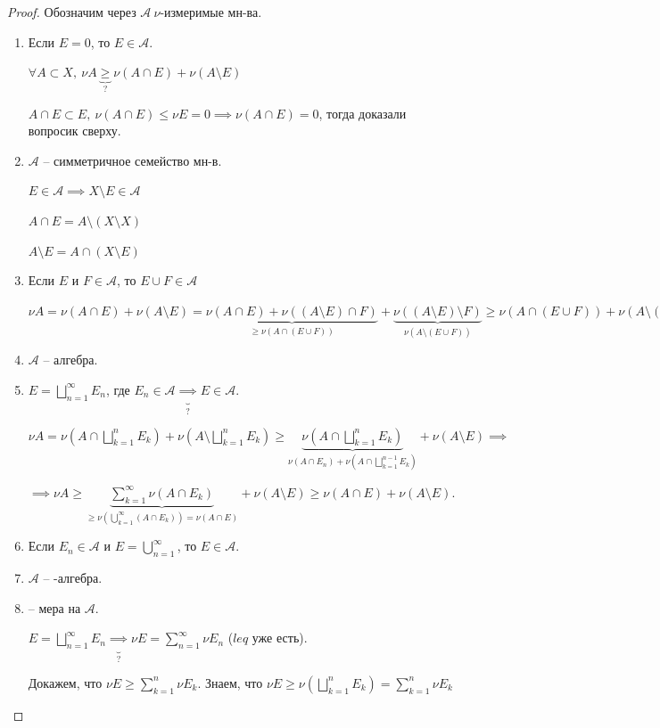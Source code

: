 \begin{proof}
    Обозначим через $\mathcal{A} \ \nu$-измеримые мн-ва. 

    \begin{enumerate}
        \item {
            Если $E = 0$, то $E \in \mathcal{A}$. 

            $\forall A \subset X, \ \nu A \underbrace{\geq}_{?} \nu (A \cap E) + \nu (A \setminus E)$

            $A \cap E \subset E, \ \nu (A \cap E) \leq \nu E = 0 \implies \nu (A \cap E) = 0$, тогда доказали вопросик сверху. 
        }
        \item {
            $\mathcal{A}$ -- симметричное семейство мн-в.
            
            $E \in \mathcal{A} \implies X \setminus E \in \mathcal{A}$
            
            $A \cap E = A \setminus (X \setminus X)$

            $A \setminus E = A \cap (X \setminus E)$
        }
        \item {
            Если $E$ и $F \in \mathcal{A}$, то $E \cup F \in \mathcal{A}$
            
            $\nu A = \nu (A \cap E) + \nu (A \setminus E) = \underbrace{\nu (A \cap E) + \nu ((A \setminus E) \cap F)}_{\geq \nu (A \cap (E \cup F))} + \underbrace{\nu ((A \setminus E) \setminus F)}_{\nu (A \setminus (E \cup F))} \geq \nu (A \cap (E \cup F)) + \nu (A \setminus (E \cup F))$
        }
        \item $\mathcal{A}$ -- алгебра.
        \item {
            $E = \bigsqcup_{n=1}^{\infty}E_n$, где $E_n \in \mathcal{A} \underbrace{\implies}_{?} E \in \mathcal{A}$.

            $\nu A = \nu (A \cap \bigsqcup_{k=1}^{n} E_k) + \nu (A \setminus \bigsqcup_{k=1}^{n} E_k) \geq \underbrace{\nu (A \cap \bigsqcup_{k=1}^{n} E_k)}_{\nu (A \cap E_n) + \nu (A \cap \bigsqcup_{k=1}^{n-1}E_k)} + \nu (A \setminus E) \implies$
            
            $\implies \nu A \geq \underbrace{\sum_{k=1}^{\infty} \nu (A \cap E_k)}_{\geq \nu (\bigcup_{k=1}^{\infty} (A \cap E_k)) = \nu (A \cap E)} + \nu (A \setminus E) \geq \nu (A \cap E) + \nu (A \setminus E)$.

        }
        \item Если $E_n \in \mathcal{A}$ и $E = \bigcup_{n=1}^{\infty}$, то $E \in \mathcal{A}$.
        \item $\mathcal{A}$ -- \sigma-алгебра.
        \item {
            \nu -- мера на $\mathcal{A}$.

            $E = \bigsqcup_{n=1}^{\infty} E_n \underbrace{\implies}_{?} \nu E = \sum_{n=1}^{\infty} \nu E_n$ ($leq$ уже есть).

            Докажем, что $\nu E \geq \sum_{k=1}^{n} \nu E_k$. Знаем, что $\nu E \geq \nu (\bigsqcup_{k=1}^{n} E_k) = \sum_{k=1}^{n} \nu E_k$
        }
    \end{enumerate}
\end{proof}

